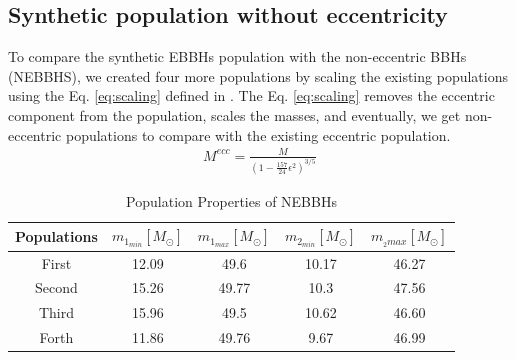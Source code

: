 \documentclass[twocolumn,prd,nofootinbib]{revtex4}
\begin{document}
\subsection{Synthetic population without eccentricity}

To compare the synthetic EBBHs population with the non-eccentric BBHs (NEBBHS), we created four more populations by scaling the existing populations using the Eq. \ref{eq:scaling} defined in \cite{2021_scaling_paper}. The Eq. \ref{eq:scaling} removes the eccentric component from the population, scales the masses, and eventually, we get non-eccentric populations to compare with the existing eccentric population.
\begin{align}
\label{eq:scaling}
M^{ecc} = \frac{M}{(1-\frac{157}{24}\epsilon^2)^{3/5}}
\end{align}




\begin{table}[]
    \centering
    \begin{tabular}{c|cccc}
        \hline \hline
        Populations & $m_{1_{min}} [M_\odot] $ & $m_{1_{max}} [M_\odot]$ & $m_{2_{min}} [M_\odot]$ & $m_{_2{max}} [M_\odot]$ \\ \hline
        First & 12.09 & 49.6 & 10.17 & 46.27 \\ \hline
        Second & 15.26 & 49.77 & 10.3 & 47.56 \\ \hline
        Third & 15.96 & 49.5 & 10.62 & 46.60  \\ \hline
        Forth & 11.86 & 49.76 & 9.67 & 46.99  \\ \hline
    \end{tabular}
    \caption{Population Properties of NEBBHs}
    \label{tab:popscl_prop}
\end{table}
 
\end{document}
